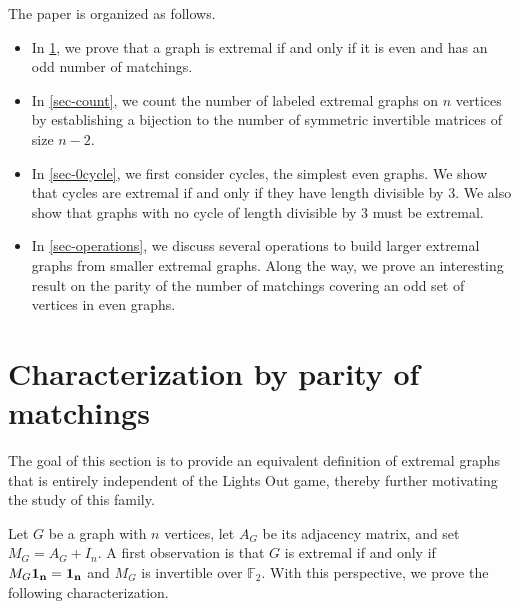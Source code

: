 \documentclass{amsart}
\theoremstyle{definition}
\theoremstyle{remark}
\def\FF{\mathbb{F}}
\begin{document}
The paper is organized as follows.
\begin{itemize}
\item In \cref{sec-char}, we prove that a graph is extremal if and only if it is even and has an odd number of matchings. 
\item In \cref{sec-count}, we count the number of labeled extremal graphs on $n$ vertices by establishing a bijection to the number of symmetric invertible matrices of size $n-2$.
\item In \cref{sec-0cycle}, we first consider cycles, the simplest even graphs. We show that cycles are extremal if and only if they have length divisible by $3$. We also show that graphs with no cycle of length divisible by 3 must be extremal.
\item In \cref{sec-operations}, we discuss several operations to build larger extremal graphs from smaller extremal graphs. Along the way, we prove an interesting result on the parity of the number of matchings covering an odd set of vertices in even graphs. 
\end{itemize}

\section{Characterization by parity of matchings}\label{sec-char}
The goal of this section is to provide an equivalent definition of extremal graphs that is entirely independent of the Lights Out game, thereby further motivating the study of this family.

 Let $G$ be a graph with $n$ vertices, let $A_G$ be its adjacency matrix, and set $M_G = A_G + I_n$. A first observation is that $G$ is extremal if and only if $M_G \bf{1}_n = \bf{1}_n$ and $M_G$ is invertible over $\FF_2$. With this perspective, we prove the following characterization.
\end{document}
